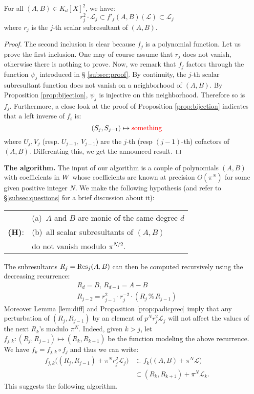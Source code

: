 \documentclass{sig-alternate}
\begin{document}
\begin{lem}
\label{lem:diff}
For all $(A,B) \in K_d[X]^2$, we have:
$$r_j^2 \cdot \mathcal L_j 
\subset f'_j(A,B)(\mathcal L) \subset \mathcal L_j$$
where $r_j$ is the $j$-th scalar subresultant of $(A,B)$.
\end{lem}

\begin{proof}
The second inclusion is clear because $f_j$ is a polynomial function. 
Let us prove the first inclusion. One may of course assume that $r_j$ 
does not vanish, otherwise there is nothing to prove. Now, we remark 
that $f_j$ factors through the function $\psi_j$ introduced in \S 
\ref{subsec:proof}. By continuity, the $j$-th scalar subresultant 
function does not vanish on a neighborhood of $(A,B)$. By Proposition 
\ref{prop:bijection}, $\psi_j$ is injective on this neighborhood. 
Therefore so is $f_j$. Furthermore, a close look at the proof of 
Proposition \ref{prop:bijection} indicates that a left inverse of $f_i$ 
is:
$$(S_j, S_{j-1}) \mapsto \ \!\!{\color{red} \text{something}}$$
where $U_j, V_j$ (resp. $U_{j-1}$, $V_{j-1}$) are the $j$-th (resp 
$(j-1)$-th) cofactors of $(A,B)$. Differenting this, we get the
announced result.
\end{proof}

\noindent
{\bf The algorithm.}
The input of our algorithm is a couple of polynomials $(A,B)$ with 
coefficients in $W$ whose coefficients are known at precision 
$O(\pi^N)$ for some given positive integer $N$. We make the following 
hypothesis (and refer to \S \ref{subsec:questions} for a brief 
discussion about it):

\medskip

\begin{tabular}{rl}
& (a)~$A$ and $B$ are monic of the same degree $d$ \\
{\bf (H)}: & (b)~all scalar subresultants of $(A,B)$ \\
& \phantom{(b)~}do not vanish modulo $\pi^{N/2}$.
\end{tabular}

\medskip

\noindent
The subresultants $R_j = \text{\rm Res}_j(A,B)$ can then be computed recursively 
using the decreasing recurrence:
$$\begin{array}{l}
R_d = B, \, R_{d-1} = A-B \\
R_{j-2} = r_{j-1}^2 \cdot r_j^{-2} \cdot (R_j \,\%\, R_{j-1})
\end{array}$$
Moreover Lemma \ref{lem:diff} and Proposition \ref{prop:padicprec} imply
that any perturbation of $(R_j, R_{j-1})$ by an element of $p^N r_j^2 
\mathcal L_j$ will not affect the values of the next $R_k$'s modulo 
$\pi^N$. Indeed, given $k > j$, let $f_{j,k} : (R_j, R_{j-1}) \mapsto 
(R_k, R_{k+1})$ be the function modeling the above recurrence. We have
$f_k = f_{j,k} \circ f_j$ and thus we can write:
\begin{align*}
f_{j,k}\big((R_j, R_{j-1}) + \pi^N r_j^2 \mathcal L_j\big) 
& \subset f_k\big((A,B) + \pi^N \mathcal L\big) \\
& \subset (R_k, R_{k+1}) + \pi^N \mathcal L_k.
\end{align*}
This suggests the following algorithm.
\end{document}
